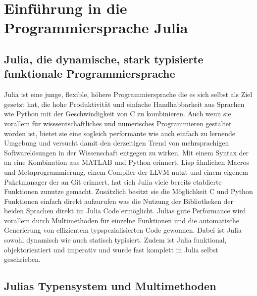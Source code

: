 \documentclass[proseminar,german,utf8]{zihpub}
\begin{document}
\section{Einführung in die Programmiersprache Julia}

\subsection{Julia, die dynamische, stark typisierte funktionale Programmiersprache}

Julia ist eine junge, flexible, höhere Programmiersprache die es sich selbst als Ziel gesetzt hat, die hohe Produktivität und einfache Handhabbarkeit aus Sprachen wie Python mit der Geschwindigkeit von C zu kombinieren. Auch wenn sie vorallem für wisssentschaftliches und numerisches Programmieren gestaltet worden ist, bietet sie eine sogleich performante wie auch einfach zu lernende Umgebung und versucht damit den derzeitigen Trend von mehrsprachigen Softwarelösungen in der Wissenschaft entgegen zu wirken. Mit einem Syntax der an eine Kombination aus MATLAB und Python erinnert, Lisp ähnlichen Macros und Metaprogrammierung, einem Compiler der LLVM nutzt und einem eigenem Paketmanager der an Git erinnert, hat sich Julia viele bereits etablierte Funktionen zunutze gemacht. Zusätzlich besitzt sie die Möglichkeit C und Python Funktionen einfach direkt aufzurufen was die Nutzung der Bibliotheken der beiden Sprachen direkt im Julia Code ermöglicht. Julias gute Performance wird vorallem durch Multimethoden für einzelne Funktionen und die automatische Generierung von effizientem typspezialisierten Code gewonnen. Dabei ist Julia sowohl dynamisch wie auch statisch typisiert. Zudem ist Julia funktional, objektorientiert und imperativ und wurde fast komplett in Julia selbst geschrieben.

\subsection{Julias Typensystem und Multimethoden}
\end{document}
